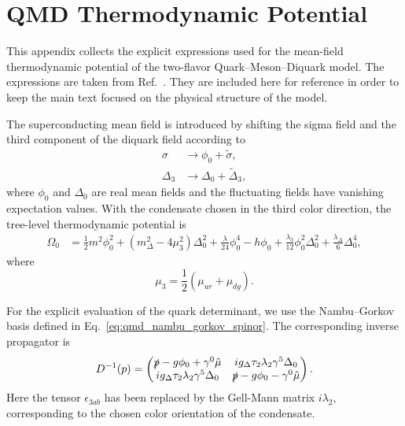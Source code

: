 \chapter{QMD Thermodynamic Potential}
\label{app:qmd_potential}

This appendix collects the explicit expressions used for the
mean-field thermodynamic potential of the two-flavor
Quark--Meson--Diquark model. The expressions are taken from
Ref.~\cite{Andersen2024}. They are included here for reference in order
to keep the main text focused on the physical structure of the model.

The superconducting mean field is introduced by shifting the sigma field
and the third component of the diquark field according to
\begin{align}
\sigma &\rightarrow \phi_0+\tilde{\sigma}, \\
\Delta_3 &\rightarrow \Delta_0+\tilde{\Delta}_3 ,
\end{align}
where \(\phi_0\) and \(\Delta_0\) are real mean fields and the fluctuating
fields have vanishing expectation values. With the condensate chosen in
the third color direction, the tree-level thermodynamic potential is
\begin{align}
\Omega_0
&=
\frac{1}{2}m^2\phi_0^2
+
\left(m_\Delta^2-4\mu_3^2\right)\Delta_0^2
+
\frac{\lambda}{24}\phi_0^4
-
h\phi_0
+
\frac{\lambda_3}{12}\phi_0^2\Delta_0^2
+
\frac{\lambda_\Delta}{6}\Delta_0^4 ,
\label{eq:app_qmd_tree_potential}
\end{align}
where
\begin{equation}
\mu_3=\frac{1}{2}\left(\mu_{ur}+\mu_{dg}\right).
\end{equation}

For the explicit evaluation of the quark determinant, we use the
Nambu--Gorkov basis defined in Eq.~\eqref{eq:qmd_nambu_gorkov_spinor}.
The corresponding inverse propagator is
\begin{equation}
D^{-1}(p)
=
\begin{pmatrix}
\slashed{p}-g\phi_0+\gamma^0\hat{\mu}
&
i g_\Delta \tau_2 \lambda_2 \gamma^5 \Delta_0
\\
i g_\Delta \tau_2 \lambda_2 \gamma^5 \Delta_0
&
\slashed{p}-g\phi_0-\gamma^0\hat{\mu}
\end{pmatrix}.
\label{eq:app_qmd_inverse_propagator}
\end{equation}
Here the tensor \(\epsilon_{3ab}\) has been replaced by the Gell-Mann
matrix \(i\lambda_2\), corresponding to the chosen color orientation of the
condensate.

